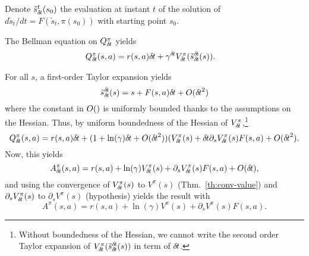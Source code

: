 Denote $\tilde{s}_{\delta\hspace{-.1em}t}^t(s_0)$ the
evaluation at instant $t$ of the solution of $d\tilde{s}_t/dt = F(\tilde{s}_t,
\pi(s_0))$ with starting point $s_0$.

The Bellman equation on $Q^\pi_{\delta\hspace{-.1em}t}$ yields
\begin{align}
	Q^\pi_{\delta\hspace{-.1em}t}(s, a) &= r(s, a) {\delta\hspace{-.1em}t} + \gamma^{\delta\hspace{-.1em}t} V^\pi_{\delta\hspace{-.1em}t}(\tilde{s}_{\delta\hspace{-.1em}t}^{\delta\hspace{-.1em}t}(s)).
\end{align}

For all $s$, a first-order Taylor expansion yields
\begin{equation}
	\tilde{s}_{\delta\hspace{-.1em}t}^{\delta\hspace{-.1em}t}(s) = s + F(s, a){\delta\hspace{-.1em}t} + O({\delta\hspace{-.1em}t}^2)
\end{equation}
where the constant in $O()$ is uniformly bounded thanks to the
assumptions on the Hessian.
Thus, by uniform boundedness of the Hessian of $V^\pi_{\delta\hspace{-.1em}t}$,\footnote{
	Without boundedness of the Hessian, we cannot write the second order Taylor expansion of
	$V^\pi_{\delta\hspace{-.1em}t}(\tilde{s}_{\delta\hspace{-.1em}t}^{\delta\hspace{-.1em}t}(s))$ in term of ${\delta\hspace{-.1em}t}$.
}
\begin{equation}
	Q^\pi_{\delta\hspace{-.1em}t}(s, a) = r(s, a) {\delta\hspace{-.1em}t} + (1 + \ln(\gamma) {\delta\hspace{-.1em}t} + O({\delta\hspace{-.1em}t}^2)) (V^\pi_{\delta\hspace{-.1em}t}(s) + {\delta\hspace{-.1em}t} \partial_s V^\pi_{\delta\hspace{-.1em}t}(s) F(s, a) + O({\delta\hspace{-.1em}t}^2).
\end{equation}
Now, this yields
\begin{equation}
	A^\pi_{\delta\hspace{-.1em}t}(s, a) = r(s, a) + \ln(\gamma) V^\pi_{\delta\hspace{-.1em}t}(s) + \partial_s V^\pi_{\delta\hspace{-.1em}t}(s) F(s, a) + O({\delta\hspace{-.1em}t}),
\end{equation}
and using the convergence of $V^\pi_{\delta\hspace{-.1em}t}(s)$ to $V^\pi(s)$ (Thm.~\ref{th:conv-value}) and $\partial_s V^\pi_{\delta\hspace{-.1em}t}(s)$ to $\partial_s V^\pi(s)$ (hypothesis) yields the result with 
\begin{equation}
	A^\pi(s, a) = r(s, a) + \ln(\gamma) V^\pi(s) + \partial_s V^\pi(s) F(s, a).
	\label{eq:adv_function}
\end{equation}

